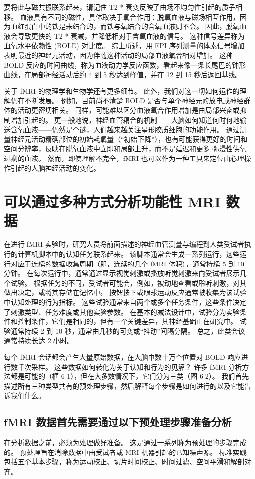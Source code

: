 要将此与磁共振联系起来，请记住 T2 * 衰变反映了由场不均匀性引起的质子相移。 血液具有不同的磁性，具体取决于氧合作用：脱氧血液与磁场相互作用，因为血红蛋白中的铁是未结合的，而铁与氧结合的含氧血液则不会。 因此，脱氧血液会导致更快的 T2 * 衰减，并降低相对于含氧血液的信号。 这种信号差异称为血氧水平依赖性 (BOLD) 对比度。 综上所述，用 EPI 序列测量的体素信号增加表明最近的神经元活动，因为伴随这种活动的局部血液氧合相对增加。 这种 BOLD 反应的时间曲线，称为血液动力学反应函数，看起来像一条长尾巴的钟形曲线，在局部神经活动后约 4 到 5 秒达到峰值，并在 12 到 15 秒后返回基线。

关于 fMRI 的物理学和生物学还有更多细节。 此外，我们对这一切如何运作的理解仍在不断发展。 例如，目前尚不清楚 BOLD 是否与单个神经元的放电或神经群体的活动更密切相关。 同样，可能难以区分血液氧合作用增加是由局部兴奋或抑制增加引起的。 更一般地说，神经血管耦合的机制——大脑如何知道何时何地输送含氧血液——仍然是个谜，人们越来越关注星形胶质细胞的功能作用。 通过测量神经元活动精确部位的初始耗氧量（“初始下降”），也有可能获得更好的时间和空间分辨率，反映在脱氧血液中立即和局部上升，而不是延迟和更多 弥漫性供氧过剩的血液。 然而，即使理解不完全，fMRI 也可以作为一种工具来定位由心理操作引起的人脑神经活动的变化。


\section{可以通过多种方式分析功能性 MRI 数据}
在进行 fMRI 实验时，研究人员将前面描述的神经血管测量与编程到人类受试者执行的计算机脚本中的认知任务联系起来。 该脚本通常会生成一系列运行，这些运行对应于连续的数据收集周期（即，连续的几个 fMRI 体积），通常持续 5 到 10 分钟。 在每次运行中，通常通过显示视觉刺激或播放听觉刺激来向受试者展示几个试验。 根据任务的不同，受试者可能会，例如，被动地查看或聆听刺激，对其做出决定，或将其存储在记忆中。 按钮按下或眼球运动反应通常被收集为该试验中认知处理的行为指标。 这些试验通常来自两个或多个任务条件，这些条件决定了刺激类型、任务难度或其他实验参数。 在基本的减法设计中，试验分为实验条件和控制条件，它们是相同的，但有一个关键差异，其神经基础正在研究中。 试验通常持续 2 到 10 秒，通常由几秒的可变或“抖动”间隔分隔。 总之，此类会议通常持续长达 2 小时。

每个 fMRI 会话都会产生大量原始数据，在大脑中数十万个位置对 BOLD 响应进行数千次采样。 这些数据如何转化为关于认知和行为的见解？ 许多 fMRI 分析方法都是可能的（框 6-1），但在大多数情况下，它们分为三类（图 6-2）。 我们首先描述所有三种类型共有的预处理步骤，然后解释每个步骤是如何进行的以及它能告诉我们什么。

\subsection{fMRI 数据首先需要通过以下预处理步骤准备分析}
在分析数据之前，必须为处理做好准备。 这是通过一系列称为预处理的步骤完成的。 预处理旨在消除数据中由受试者或 MRI 机器引起的已知噪声源。 标准实践包括五个基本步骤，称为运动校正、切片时间校正、时间过滤、空间平滑和解剖对齐。

